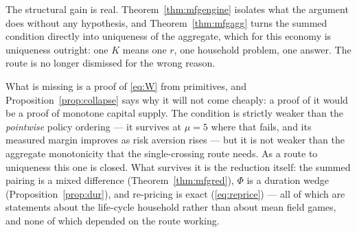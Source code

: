 The structural gain is real. Theorem~\ref{thm:mfgengine} isolates what the argument does without
any hypothesis, and Theorem~\ref{thm:mfgagg} turns the summed condition directly into uniqueness
of the aggregate, which for this economy is uniqueness outright: one $K$ means one $r$, one
household problem, one answer. The route is no longer dismissed for the wrong reason.

What is missing is a proof of \eqref{eq:W} from primitives, and Proposition~\ref{prop:collapse}
says why it will not come cheaply: a proof of it would be a proof of monotone capital supply. The
condition is strictly weaker than the \emph{pointwise} policy ordering --- it survives at $\mu=5$
where that fails, and its measured margin improves as risk aversion rises ---
but it is not weaker than the aggregate monotonicity that the single-crossing route needs. As a
route to uniqueness this one is closed. What survives it is the reduction itself: the summed
pairing is a mixed difference (Theorem~\ref{thm:mfgred}), $\Phi$ is a duration wedge
(Proposition~\ref{prop:dur}), and re-pricing is exact (\ref{eq:reprice}) --- all of which are
statements about the life-cycle household rather than about mean field games, and none of which
depended on the route working.
